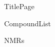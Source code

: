 \documentclass[10pt,a4paper]{article}
\begin{document}
{TitlePage}

{CompoundList}

\tableofcontents

%


%
{NMRs}


\newpage
{}


\listoftodos
\end{document}
